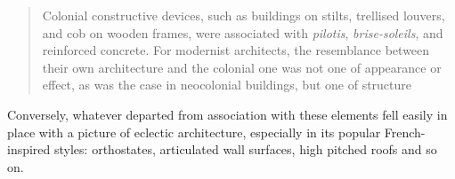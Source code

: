 \begin{quote}
Colonial constructive devices, such as buildings on stilts, trellised
louvers, and cob on wooden frames, were associated with \emph{pilotis},
\emph{brise-soleils}, and reinforced concrete. For modernist architects,
the resemblance between their own architecture and the colonial one was
not one of appearance or effect, as was the case in neocolonial
buildings, but one of structure
\autocite[p.~188]{fonseca:2005patrimonio}
\end{quote}

Conversely, whatever departed from association with these elements fell
easily in place with a picture of eclectic architecture, especially in
its popular French-inspired styles: orthostates, articulated wall
surfaces, high pitched roofs and so on.
